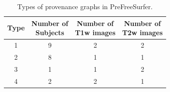\documentclass[a4paper,num-refs]{oup-contemporary}
\newcommand{\tristan}[1]{\color{orange}\textbf{From Tristan:}#1\color{black}}
\begin{document}


\begin{table}[b]
  \centering
  \begin{threeparttable}
  \caption{Types of provenance graphs in PreFreeSurfer.}
  \label{table:data-clusters}
  \begin{tabular}{cc|cc}
  \toprule
  Type   &   \makecell{Number of \\ Subjects}   &  \makecell{Number of \\ T1w images}          & \makecell{Number of \\ T2w images}   \\ \midrule
  1      &               9                      &  2 & 2 \\
  2      &               8                      &  1 & 1 \\
  3      &               1                      &  1 & 2 \\
  4      &               2                      &  2 & 1\\
  \bottomrule
  \end{tabular}
  \end{threeparttable}
  \end{table}
\end{document}
